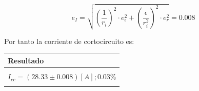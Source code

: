 \documentclass[letter,11pt]{article}
\begin{document}
\begin{equation*}
    e_I = \sqrt{ \left(\frac{1}{r_i}\right)^2 \cdot e^2_\epsilon + \left(\frac{\epsilon}{r^2_i}\right)^2 \cdot e^2_r } = 0.008
\end{equation*}

Por tanto la corriente de cortocircuito es:

\begin{center}
\begin{tabular}{|>{\centering}m{11.0cm}<{\centering}|}
\hline
\textbf{Resultado}
\tabularnewline \hline
\\
$I_{cc} = (28.33 \pm 0.008) [A]; 0.03 \%$ \tabularnewline
\\
\hline
\end{tabular}
\end{center}
\end{document}
